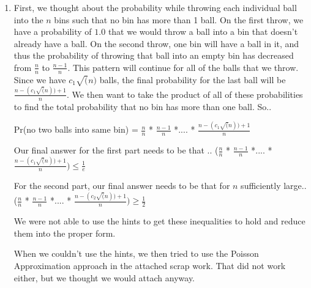 \documentclass[11pt]{amsart}
\begin{document}
\begin{enumerate}
{}
\item {}

{
First, we thought about the probability while throwing each individual ball into the $n$ bins such that no bin has more than 1 ball. On the first throw, we have a probability of $1.0$ that we would throw a ball into a bin that doesn't already have a ball. On the second throw, one bin will have a ball in it, and thus the probability of throwing that ball into an empty bin has decreased from $\frac{n}{n}$ to $\frac{n-1}{n}$. This pattern will continue for all of the balls that we throw. Since we have $c_1\sqrt(n)$ balls, the final probability for the last ball will be $\frac{n-(c_1\sqrt(n)) + 1}{n}$. We then want to take the product of all of these probabilities to find the total probability that no bin has more than one ball. So.. \newline

Pr(no two balls into same bin) = $\frac{n}{n}$ * $\frac{n-1}{n}$ *.... * $\frac{n-(c_1\sqrt(n)) + 1}{n}$ \newline

Our final answer for the first part needs to be that .. \newline ($\frac{n}{n}$ * $\frac{n-1}{n}$ *.... * $\frac{n-(c_1\sqrt(n)) + 1}{n}) \leq \frac{1}{e}$ \newline

For the second part, our final answer needs to be that for $n$ sufficiently large.. ($\frac{n}{n}$ * $\frac{n-1}{n}$ *.... * $\frac{n-(c_2\sqrt(n)) + 1}{n}) \geq \frac{1}{2}$ \newline

We were not able to use the hints to get these inequalities to hold and reduce them into the proper form. \newline

When we couldn't use the hints, we then tried to use the Poisson Approximation approach in the attached scrap work. That did not work either, but we thought we would attach anyway. \newline




}
\end{enumerate}
\end{document}
